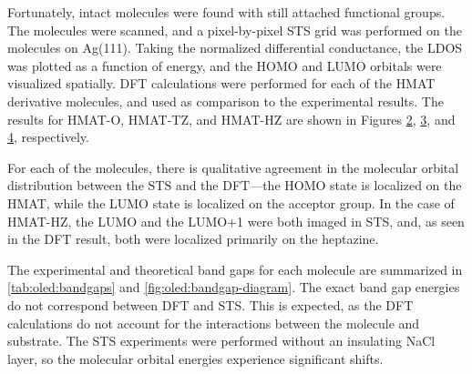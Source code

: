 \begin{figure} [h]
    \centering
    \caption{}
    \label{fig:oled:hmat-frag}
\end{figure}

Fortunately, intact molecules were found with still attached functional groups. The molecules were scanned, and a pixel-by-pixel \ac{STS} grid was performed on the molecules on Ag(111). Taking the normalized differential conductance, the \ac{LDOS} was plotted as a function of energy, and the \ac{HOMO} and \ac{LUMO} orbitals were visualized spatially. \ac{DFT} calculations were performed for each of the \ac{HMAT} derivative molecules, and used as comparison to the experimental results. The results for HMAT-O, HMAT-TZ, and HMAT-HZ are shown in Figures \ref{fig:oled:hmat-o}, \ref{fig:oled:hmat-tz}, and \ref{fig:oled:hmat-hz}, respectively. 

\begin{figure} [h]
    \centering
    \caption{}
    \label{fig:oled:hmat-o}
\end{figure}

\begin{figure} [h]
    \centering
    \caption{}
    \label{fig:oled:hmat-tz}
\end{figure}

\begin{figure} [h]
    \centering
    \caption{}
    \label{fig:oled:hmat-hz}
\end{figure}

For each of the molecules, there is qualitative agreement in the molecular orbital distribution between the \ac{STS} and the \ac{DFT}---the \ac{HOMO} state is localized on the \ac{HMAT}, while the \ac{LUMO} state is localized on the acceptor group. In the case of \ac{HMAT-HZ}, the LUMO and the LUMO+1 were both imaged in \ac{STS}, and, as seen in the \ac{DFT} result, both were localized primarily on the heptazine.

The experimental and theoretical band gaps for each molecule are summarized in \autoref{tab:oled:bandgaps} and \autoref{fig:oled:bandgap-diagram}. The exact band gap energies do not correspond between \ac{DFT} and \ac{STS}. This is expected, as the \ac{DFT} calculations do not account for the interactions between the molecule and substrate. The \ac{STS} experiments were performed without an insulating NaCl layer, so the molecular orbital energies experience significant shifts.

